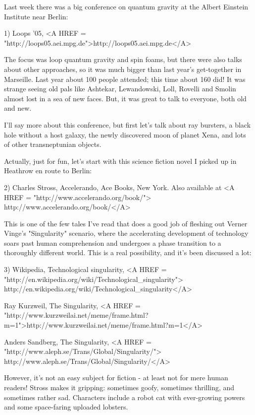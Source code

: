 


Last week there was a big conference on quantum gravity at
the Albert Einstein Institute near Berlin:

1) Loops '05, 
<A HREF = "http://loops05.aei.mpg.de">http://loops05.aei.mpg.de</A>

The focus was loop quantum gravity and spin foams, but there 
were also talks about other approaches, so it was much bigger than
last year's get-together in Marseille.  Last year about 100 people
attended; this time about 160 did!  It was strange seeing old pals 
like Ashtekar, Lewandowski, Loll, Rovelli and Smolin almost lost 
in a sea of new faces.  But, it was great to talk to everyone, 
both old and new.

I'll say more about this conference, but first let's talk about 
\gamma  ray bursters, a black hole without a host galaxy, the newly 
discovered moon of planet Xena, and lots of other transneptunian 
objects.

Actually, just for fun, let's start with this science fiction novel
I picked up in Heathrow en route to Berlin:

2) Charles Stross, Accelerando, Ace Books, New York.
Also available at <A HREF = "http://www.accelerando.org/book/">
http://www.accelerando.org/book/</A>

This is one of the few tales I've read that does a good job of 
fleshing out Verner Vinge's "Singularity" scenario, where the 
accelerating development of technology soars past human 
comprehension and undergoes a phase transition to a thoroughly 
different world.   This is a real possibility, and it's been 
discussed a lot:

3) Wikipedia, Technological singularity, 
<A HREF = "http://en.wikipedia.org/wiki/Technological_singularity">
http://en.wikipedia.org/wiki/Technological_singularity</A>

Ray Kurzweil, The Singularity,
<A HREF = "http://www.kurzweilai.net/meme/frame.html?m=1">http://www.kurzweilai.net/meme/frame.html?m=1</A>

Anders Sandberg, The Singularity, 
<A HREF = "http://www.aleph.se/Trans/Global/Singularity/">
http://www.aleph.se/Trans/Global/Singularity/</A>

However, it's not an easy subject for fiction - at least not for 
mere human readers!  Stross makes it gripping: sometimes goofy, sometimes
thrilling, and sometimes rather sad.  Characters include a robot cat
with ever-growing powers and some space-faring uploaded lobsters.  

